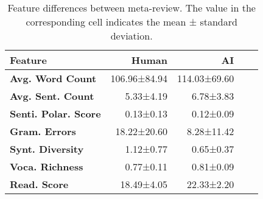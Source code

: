 \begin{table}[ht]

\centering
\footnotesize 
\begin{tabular}{@{}l|r@{\hskip 2mm}r@{\hskip 2mm}r@{\hskip 2mm}r@{}}
\toprule
\textbf{Feature}         & \textbf{Human}         & \textbf{AI}           \\ \midrule
\textbf{Avg. Word Count}          & 106.96±84.94 & 114.03±69.60 \\
\textbf{Avg. Sent. Count}       & 5.33±4.19   & 6.78±3.83  \\
\textbf{Senti. Polar. Score} & 0.13±0.13    & 0.12±0.09    \\
\textbf{Gram. Errors} & 18.22±20.60   & 8.28±11.42    \\
\textbf{Synt. Diversity} & 1.12±0.77   & 0.65±0.37    \\
\textbf{Voca. Richness}   & 0.77±0.11     & 0.81±0.09    \\
\textbf{Read. Score}     & 18.49±4.05    & 22.33±2.20    \\
\bottomrule
\end{tabular}
\caption{Feature differences between meta-review. The value in the corresponding cell indicates the mean ± standard deviation.}
\label{tab:feature_comparison}
\end{table}